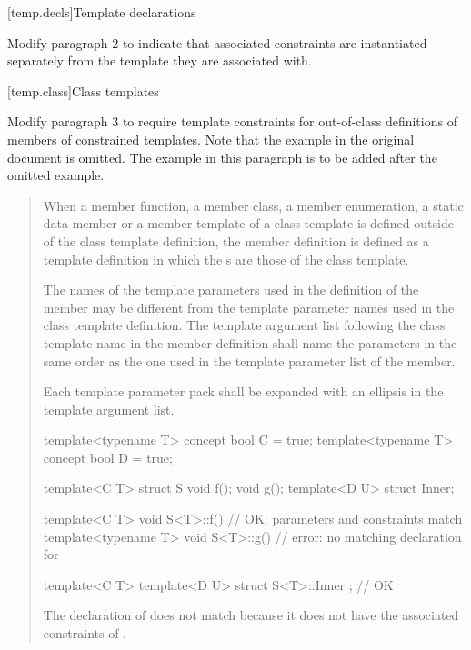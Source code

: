 \setcounter{section}{5}
[temp.decls]{Template declarations}

Modify paragraph 2 to indicate that associated constraints are
instantiated separately from the template they are associated with.


[temp.class]{Class templates}

Modify paragraph 3 to require template constraints for out-of-class
definitions of members of constrained templates. Note that the example
in the original document is omitted. The example in this paragraph
is to be added after the omitted example.

\begin{quote}
\setcounter{Paras}{2}
\pnum
When a member function, a member class, a member enumeration, a static 
data member or a member template of a class template is defined outside 
of the class template definition, the member definition is defined as a 
template definition in which the 
s 
 are those of the class template.

The names of the template parameters used in the definition of the 
member may be different from the template parameter names used in the 
class template definition. The template argument list following the class
template name in the member definition shall name the parameters in the 
same order as the one used in the template parameter list of the member. 

Each template parameter pack shall be expanded with an ellipsis in the 
template argument list.

\enterexample
\begin{codeblock}
template<typename T> concept bool C = true;
template<typename T> concept bool D = true;

template<C T> struct S {
    void f();
    void g();
    template<D U> struct Inner;
  }

template<C T> void S<T>::f() { }        // OK: parameters and constraints match
template<typename T> void S<T>::g() { } // error: no matching declaration for 

template<C T> 
  template<D U> struct S<T>::Inner { }; // OK
\end{codeblock}
The declaration of  does not match because
it does not have the associated constraints of .
\exitexample
\end{quote}

